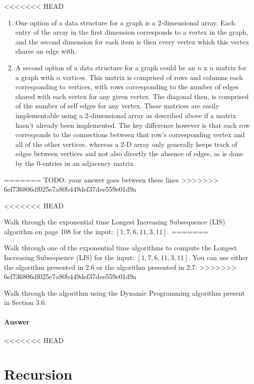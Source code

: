 \documentclass{article}
\begin{document}

<<<<<<< HEAD
\begin{enumerate}
	\item
		One option of a data structure for a graph is a 2-dimensional array. Each entry of the array in the first
		dimension corresponds to a vertex in the graph, and the second dimension for each item is then every vertex
		which this vertex shares an edge with.
	\item
		A second option of a data structure for a graph could be an $n$ x $n$ matrix for a graph with $n$ vertices.
		This matrix is comprised of rows and columns each corresponding to vertices, with rows corresponding to the
		number of edges shared with each vertex for any given vertex. The diagonal then, is comprised of the number
		of self edges for any vertex. These matrices are easily implementable using a 2-dimensional array as
		described above if a matrix hasn't already been implemented. The key difference however is that each row
		corresponds to the connections between that row's corresponding vertex and all of the other vertices, whereas
		a 2-D array only generally keeps track of edges between vertices and not also directly the absence of edges,
		as is done by the 0-entries in an adjacency matrix.
\end{enumerate}
=======
TODO: your answer goes between these lines
>>>>>>> 6ef736806df025e7a80b449def37dee559e01d9a



\nextprob
<<<<<<< HEAD

Walk through the exponential time Longest Increasing Subsequence (LIS) algorithm
on page 108 for the input: $\left[ 1, 7, 6, 11, 3, 11 \right]$.
=======

Walk through one of the exponential time algorithms to compute the Longest
Increasing Subsequence (LIS) for the input: $\left[ 1, 7, 6, 11, 3, 11 \right]$.
You can use either the algorithm presented in 2.6 or the algorithm presented in
2.7.
>>>>>>> 6ef736806df025e7a80b449def37dee559e01d9a

Walk through the algorithm using the Dynamic Programming algorithm present in
Section 3.6.

\paragraph{Answer}
<<<<<<< HEAD
\section{Recursion}
\end{document}
